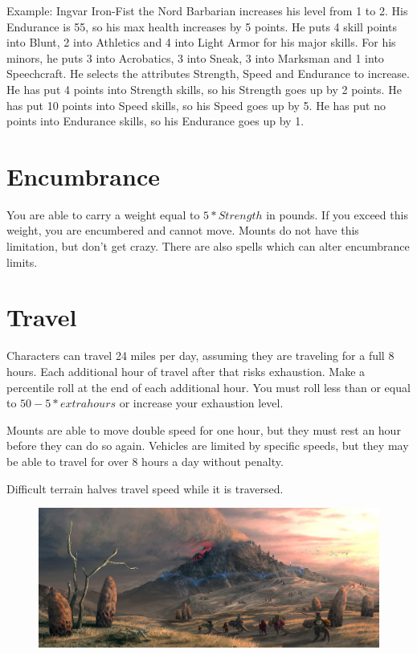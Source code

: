 \documentclass[12pt]{book}
\begin{document}
Example: Ingvar Iron-Fist the Nord Barbarian increases his level from 1 to 2. His Endurance is 55, so his max health increases by 5 points. He puts 4 skill points into Blunt, 2 into Athletics and 4 into Light Armor for his major skills. For his minors, he puts 3 into Acrobatics, 3 into Sneak, 3 into Marksman and 1 into Speechcraft. He selects the attributes Strength, Speed and Endurance to increase. He has put 4 points into Strength skills, so his Strength goes up by 2 points. He has put 10 points into Speed skills, so his Speed goes up by 5. He has put no points into Endurance skills, so his Endurance goes up by 1.

\section{Encumbrance}
You are able to carry a weight equal to $5*Strength$ in pounds. If you exceed this weight, you are encumbered and cannot move. Mounts do not have this limitation, but don't get crazy. There are also spells which can alter encumbrance limits.

\section{Travel}
Characters can travel 24 miles per day, assuming they are traveling for a full 8 hours. Each additional hour of travel after that risks exhaustion. Make a percentile roll at the end of each additional hour. You must roll less than or equal to $50-5*extra hours$ or increase your exhaustion level.

Mounts are able to move double speed for one hour, but they must rest an hour before they can do so again. Vehicles are limited by specific speeds, but they may be able to travel for over 8 hours a day without penalty.

Difficult terrain halves travel speed while it is traversed.

\begin{figure}[H]
	\includegraphics[width=\textwidth]{Morrowind.png}
\end{figure}
\end{document}

